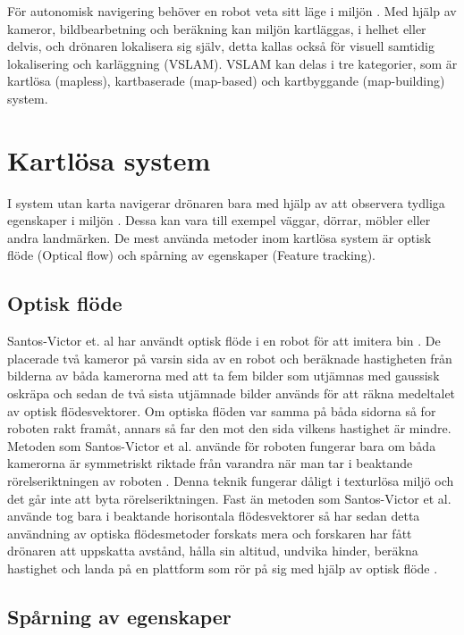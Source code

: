 För autonomisk navigering behöver en robot veta sitt läge i miljön \citep{geospatial}. Med hjälp av kameror, bildbearbetning och beräkning kan miljön kartläggas, i helhet eller delvis, och drönaren lokalisera sig själv, detta kallas också för visuell samtidig lokalisering och karläggning (VSLAM). VSLAM kan delas i tre kategorier, som är kartlösa (mapless), kartbaserade (map-based) och kartbyggande (map-building) system. 

\section{Kartlösa system}

I system utan karta navigerar drönaren bara med hjälp av att observera tydliga egenskaper i miljön \citep{982903}. Dessa kan vara till exempel väggar, dörrar, möbler eller andra landmärken. De mest använda metoder inom kartlösa system är optisk flöde (Optical flow) och spårning av egenskaper (Feature tracking). 

\subsection{Optisk flöde}

Santos-Victor et. al har användt optisk flöde i en robot för att imitera bin \citep{341094}. De placerade två kameror på varsin sida av en robot och beräknade hastigheten från bilderna av båda kamerorna med att ta fem bilder som utjämnas med gaussisk oskräpa och sedan de två sista utjämnade bilder används för att räkna medeltalet av optisk flödesvektorer. Om optiska flöden var samma på båda sidorna så for roboten rakt framåt, annars så far den mot den sida vilkens hastighet är mindre. Metoden som Santos-Victor et al. använde för roboten fungerar bara om båda kamerorna är symmetriskt riktade från varandra när man tar i beaktande rörelseriktningen av roboten \citep{982903}. Denna teknik fungerar dåligt i texturlösa miljö och det går inte att byta rörelseriktningen. Fast än metoden som Santos-Victor et al. använde tog bara i beaktande horisontala flödesvektorer så har sedan detta användning av optiska flödesmetoder forskats mera och forskaren har fått drönaren att uppskatta avstånd, hålla sin altitud, undvika hinder, beräkna hastighet och landa på en plattform som rör på sig med hjälp av optisk flöde \citep{6564752}.

\subsection{Spårning av egenskaper}

